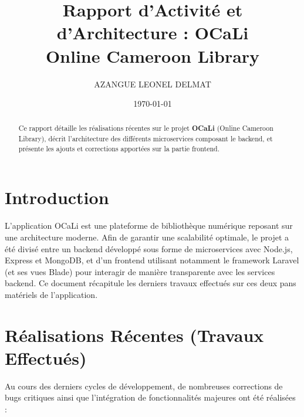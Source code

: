 \documentclass[12pt,a4paper]{article}
\title{\textbf{Rapport d'Activité et d'Architecture : OCaLi} \\ \large{Online Cameroon Library}}
\author{AZANGUE LEONEL DELMAT}
\date{\today}
\begin{document}
\maketitle

\vspace{1.5cm}

\begin{abstract}
Ce rapport détaille les réalisations récentes sur le projet \textbf{OCaLi} (Online Cameroon Library), décrit l'architecture des différents microservices composant le backend, et présente les ajouts et corrections apportées sur la partie frontend.
\end{abstract}

\newpage

\tableofcontents

\newpage

\section{Introduction}
L'application OCaLi est une plateforme de bibliothèque numérique reposant sur une architecture moderne. Afin de garantir une scalabilité optimale, le projet a été divisé entre un backend développé sous forme de microservices avec Node.js, Express et MongoDB, et d'un frontend utilisant notamment le framework Laravel (et ses vues Blade) pour interagir de manière transparente avec les services backend.
Ce document récapitule les derniers travaux effectués sur ces deux pans matériels de l'application.

\section{Réalisations Récentes (Travaux Effectués)}
Au cours des derniers cycles de développement, de nombreuses corrections de bugs critiques ainsi que l'intégration de fonctionnalités majeures ont été réalisées :
\end{document}
